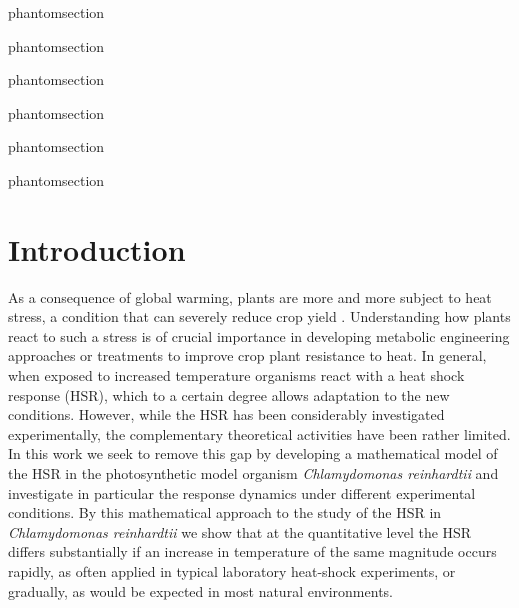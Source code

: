 \documentclass[oneside, 10pt, a4paper, twocolumn]{article}
\makeatletter
\newcommand{\labeltext}[2]{%
  \@bsphack
  \csname phantomsection\endcsname %
  \def\@currentlabel{#1}{\label{#2}}%
  \@esphack
}
\makeatother
\begin{document}
\labeltext{1}{TabVars}
\labeltext{2}{TabODEs}
\labeltext{5}{TabNUs}
\labeltext{A}{Tables}
\labeltext{3}{TabRefVal}
\labeltext{4}{TabKs}


\section{Introduction}

As a consequence of global warming, plants are more and more subject to heat stress, a condition that can severely reduce crop yield \cite{Lobell2011,Deryng2014}.
Understanding how plants react to such a stress is of crucial importance in developing metabolic engineering approaches or treatments to improve crop plant resistance to heat. 
In general, when exposed to increased temperature organisms react
with a heat shock response (HSR), which to a certain degree allows adaptation to the new conditions. 
However, while the HSR has been %
considerably investigated experimentally, the complementary
theoretical activities %
have been rather limited. In this work we seek to remove this gap by
developing a mathematical model of the HSR in the photosynthetic model
organism \emph{Chlamydomonas reinhardtii} and investigate in
particular the response dynamics under different experimental
conditions. By this mathematical approach to the study of the HSR in
\emph{Chlamydomonas reinhardtii} we show that at the quantitative
level the HSR differs substantially if an increase in temperature of
the same magnitude occurs {rapidly, as often applied
  in typical laboratory heat-shock experiments, or gradually, as would be
  expected in most natural environments.}
\end{document}
